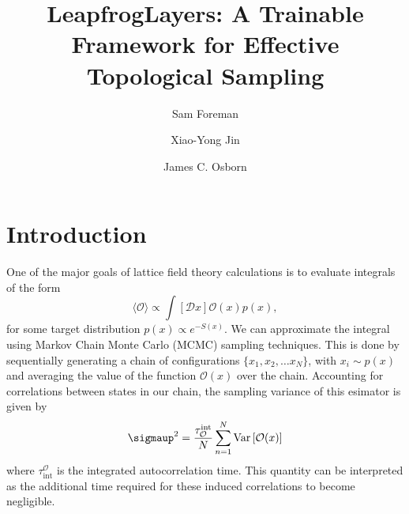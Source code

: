 \documentclass[a4paper,11pt]{article}
\title{LeapfrogLayers: A Trainable Framework for Effective Topological Sampling}
\author*[a]{Sam Foreman}
\author[a]{Xiao-Yong Jin}
\author[a]{James C. Osborn}
\affiliation[a]{Argonne National Laboratory,\\
  Lemont, IL}
\begin{document}
\maketitle


\section{\label{sec:intro}Introduction}
%
\marginpar{\textcolor{red}{Background}}
%
One of the major goals of lattice field theory calculations is to evaluate
integrals of the form
%
\begin{equation}
    \langle \mathcal{O} \rangle \propto \int \left[ \mathcal{D} x \right] \mathcal{O}(x) p(x),
    \label{eq:density_integral}
\end{equation}
%
for some target distribution \(p(x)\propto e^{-S(x)}\).
%
We can approximate the integral using Markov Chain Monte Carlo (MCMC) sampling
techniques.
%
This is done by sequentially generating a chain of configurations \(\{x_{1},
x_{2}, \ldots x_{N}\}\), with \(x_{i} \sim p(x)\) and averaging the value of
the function \(\mathcal{O}(x)\) over the chain.
%
Accounting for correlations between states in our chain, the sampling variance
of this esimator is given by
%
\begin{equation}
    \sigmaup^{2} = \frac{\tau_{\mathcal{O}}^{\mathrm{int}}}{N}\sum_{n=1}^{N} \mathrm{Var}\left[\mathcal{O}(x)\right]
\end{equation}
%
where \(\tau_{\mathrm{int}}^{\mathcal{O}}\) is the integrated autocorrelation
time.
%
This quantity can be interpreted as the additional time required for
these induced correlations to become negligible.
%
\end{document}
